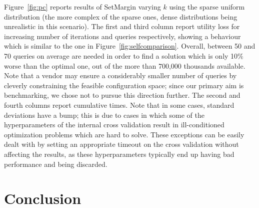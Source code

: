 \documentclass{article}
\renewcommand\[{\begin{equation}}
\renewcommand\]{\end{equation}}
\begin{document}
Figure~\ref{fig:pc} reports results of {\sc SetMargin} varying $k$
using the sparse uniform distribution (the more complex of the sparse
ones, dense distributions being unrealistic in this scenario). The
first and third column report utility loss for increasing number of
iterations and queries respectively, showing a behaviour which is
similar to the one in Figure~\ref{fig:selfcomparison}. Overall,
between 50 and 70 queries on average are needed in order to find  a
solution which is only 10\% worse than the optimal one, out of the
more than 700,000 thousands available. Note that a vendor may ensure a
considerably smaller number of queries by cleverly constraining the
feasible configuration space; since our primary aim is benchmarking,
we chose not to pursue this direction further.  The second and fourth
columns report cumulative times. Note that in some cases, standard
deviations have a bump; this is due to cases in which some of the
hyperparameters of the internal cross validation result in
ill-conditioned optimization problems which are hard to solve. These
exceptions can be easily dealt with by setting an appropriate timeout
on the cross validation without affecting the results, as these
hyperparameters typically end up having bad performance and being
discarded.



\section{Conclusion}
\label{sec:conclusions}
\end{document}
